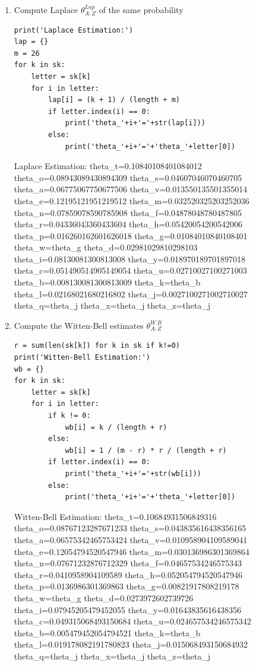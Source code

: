 \documentclass[preprint,12pt]{elsarticle}
\begin{document}
\begin{enumerate}
    \item Compute Laplace $\theta_{A:Z}^{Lap}$ of the same probability
    \begin{lstlisting}
print('Laplace Estimation:')
lap = {}
m = 26
for k in sk:
    letter = sk[k]
    for i in letter:
        lap[i] = (k + 1) / (length + m)
        if letter.index(i) == 0:
            print('theta_'+i+'='+str(lap[i]))
        else:
            print('theta_'+i+'='+'theta_'+letter[0])
    \end{lstlisting}
    \begin{spverbatim}
    Laplace Estimation:
    theta_t=0.10840108401084012
    theta_o=0.08943089430894309
    theta_s=0.04607046070460705
    theta_a=0.06775067750677506
    theta_v=0.013550135501355014
    theta_e=0.12195121951219512
    theta_m=0.032520325203252036
    theta_n=0.07859078590785908
    theta_f=0.04878048780487805
    theta_r=0.04336043360433604
    theta_h=0.05420054200542006
    theta_p=0.016260162601626018
    theta_g=0.01084010840108401
    theta_w=theta_g
    theta_d=0.02981029810298103
    theta_i=0.08130081300813008
    theta_y=0.018970189701897018
    theta_c=0.051490514905149054
    theta_u=0.02710027100271003
    theta_b=0.008130081300813009
    theta_k=theta_b
    theta_l=0.02168021680216802
    theta_j=0.0027100271002710027
    theta_q=theta_j
    theta_x=theta_j
    theta_z=theta_j    
    \end{spverbatim}
    
    \item Compute the Witten-Bell estimates $\theta_{A:Z}^{W\ B}$

    \begin{lstlisting}
r = sum(len(sk[k]) for k in sk if k!=0)
print('Witten-Bell Estimation:')
wb = {}
for k in sk:
    letter = sk[k]
    for i in letter:
        if k != 0:
            wb[i] = k / (length + r)
        else:
            wb[i] = 1 / (m - r) * r / (length + r)
        if letter.index(i) == 0:
            print('theta_'+i+'='+str(wb[i]))
        else:
            print('theta_'+i+'='+'theta_'+letter[0])
    \end{lstlisting}
    \begin{spverbatim}
    Witten-Bell Estimation:
    theta_t=0.10684931506849316
    theta_o=0.08767123287671233
    theta_s=0.043835616438356165
    theta_a=0.06575342465753424
    theta_v=0.010958904109589041
    theta_e=0.12054794520547946
    theta_m=0.030136986301369864
    theta_n=0.07671232876712329
    theta_f=0.04657534246575343
    theta_r=0.0410958904109589
    theta_h=0.052054794520547946
    theta_p=0.0136986301369863
    theta_g=0.00821917808219178
    theta_w=theta_g
    theta_d=0.0273972602739726
    theta_i=0.07945205479452055
    theta_y=0.01643835616438356
    theta_c=0.049315068493150684
    theta_u=0.024657534246575342
    theta_b=0.005479452054794521
    theta_k=theta_b
    theta_l=0.019178082191780823
    theta_j=0.015068493150684932
    theta_q=theta_j
    theta_x=theta_j
    theta_z=theta_j
    \end{spverbatim}


\end{enumerate}
\end{document}

